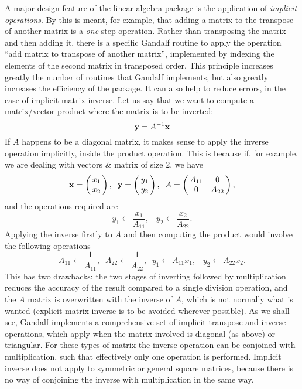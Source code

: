 A major design feature of the linear algebra package is the application
of {\em implicit operations}. By this is meant, for example, that adding
a matrix to the transpose of another matrix is a {\em one} step operation.
Rather than transposing the matrix and then adding it, there is a specific
Gandalf routine to apply the operation ``add matrix to transpose of another
matrix'', implemented by indexing the elements of the second matrix in
transposed order. This principle increases greatly the number of routines
that Gandalf implements, but also greatly increases the efficiency of
the package. It can also help to reduce errors, in the case of implicit
matrix inverse. Let us say that we want to compute a matrix/vector product
where the matrix is to be inverted:
\[ {\bf y} = A^{-1} {\bf x}
\]
If $A$ happens to be a diagonal matrix, it makes sense to apply the inverse
operation implicitly, inside the product operation. This is because if, for
example, we are dealing with vectors \& matrix of size 2, we have
\[ \xvec=\beginm{c} x_1 \\ x_2 \endm,\;\;\yvec=\beginm{c} y_1 \\ y_2 \endm,\;\;
   A=\beginm{cc} A_{11} & 0 \\ 0 & A_{22} \endm,
\]
and the operations required are
\[ y_1 \leftarrow \frac{x_1}{A_{11}}, \;\;\; y_2 \leftarrow \frac{x_2}{A_{22}}.
\]
Applying the inverse firstly to $A$ and then computing the product would
involve the following operations
\[ A_{11} \leftarrow \frac{1}{A_{11}}, \;\;
   A_{22} \leftarrow \frac{1}{A_{22}}, \;\;
   y_1 \leftarrow A_{11} x_1, \;\;\; y_2 \leftarrow A_{22} x_2.
\]
This has two drawbacks: the two stages of inverting followed by multiplication
reduces the accuracy of the result compared to a single division operation,
and the $A$ matrix is overwritten with the inverse of $A$, which is not
normally what is wanted (explicit matrix inverse is to be avoided wherever
possible). As we shall see, Gandalf implements a comprehensive set of
implicit transpose and inverse operations, which apply when the matrix
involved is diagonal (as above) or triangular. For these types of matrix
the inverse operation can be conjoined with multiplication, such that
effectively only one operation is performed.
Implicit inverse does not apply to symmetric or general square matrices,
because there is no way of conjoining the inverse with multiplication in
the same way.




